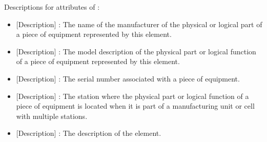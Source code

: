 Descriptions for attributes of :

\begin{itemize}
\item {}[Description] : The name of the manufacturer of the physical or logical part of a piece of equipment represented by this element.
\item {}[Description] : The model description of the physical part or logical function of a piece of equipment represented by this element.
\item {}[Description] : The serial number associated with a piece of equipment.
\item {}[Description] : The station where the physical part or logical function of a piece of equipment is located when it is part of a manufacturing unit or cell with multiple stations.
\item {}[Description] : The description of the element.
\end{itemize}
\FloatBarrier
